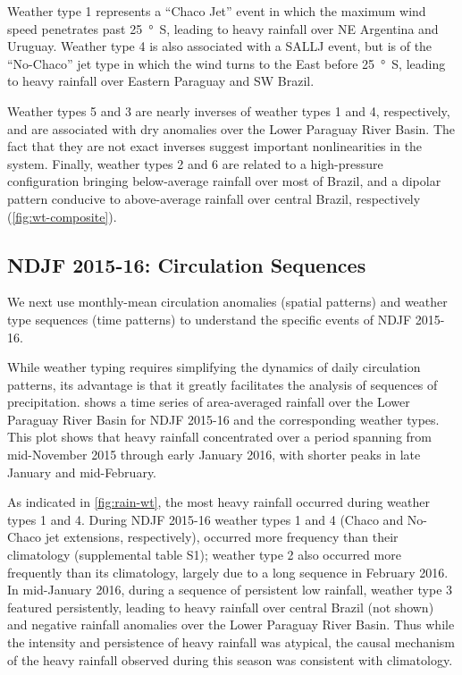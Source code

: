 \documentclass[twocol]{ametsoc}
\begin{document}
Weather type 1 represents a ``Chaco Jet'' event \citep{Salio:2002ev} in which the maximum wind speed penetrates past \SI{25}{\degree S}, leading to heavy rainfall over NE Argentina and Uruguay.
Weather type 4 is also associated with a SALLJ event, but is of the ``No-Chaco'' jet type in which the wind turns to the East before \SI{25}{\degree S}, leading to heavy rainfall over Eastern Paraguay and SW Brazil.

Weather types 5 and 3 are nearly inverses of weather types 1 and 4, respectively, and are associated with dry anomalies over the Lower Paraguay River Basin.
The fact that they are not exact inverses suggest important nonlinearities in the system.
Finally, weather types 2 and 6 are related to a high-pressure configuration bringing below-average rainfall over most of Brazil, and a dipolar pattern conducive to above-average rainfall over central Brazil, respectively (\cref{fig:wt-composite}).

\subsection{NDJF 2015-16: Circulation Sequences}

We next use monthly-mean circulation anomalies (spatial patterns) and weather type sequences (time patterns) to understand the specific events of NDJF 2015-16.

While weather typing requires simplifying the dynamics of daily circulation patterns, its advantage is that it greatly facilitates the analysis of sequences of precipitation.
 shows a time series of area-averaged rainfall over the Lower Paraguay River Basin for NDJF 2015-16 and the corresponding weather types.
This plot shows that heavy rainfall concentrated over a period spanning from mid-November 2015 through early January 2016, with shorter peaks in late January and mid-February.

As indicated in \cref{fig:rain-wt}, the most heavy rainfall occurred during weather types 1 and 4.
During NDJF 2015-16 weather types 1 and 4 (Chaco and No-Chaco jet extensions, respectively),  occurred more frequency than their climatology (supplemental table S1); weather type 2 also occurred more frequently than its climatology, largely due to a long sequence in February 2016.
In mid-January 2016, during a sequence of persistent low rainfall, weather type 3 featured persistently, leading to heavy rainfall over central Brazil (not shown) and negative rainfall anomalies over the Lower Paraguay River Basin.
Thus while the intensity and persistence of heavy rainfall was atypical, the causal mechanism of the heavy rainfall observed during this season was consistent with climatology.
\end{document}
